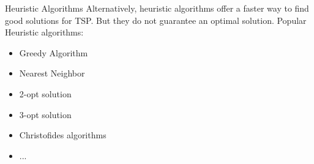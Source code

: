 \documentclass[12pt]{beamer}
\begin{document}
 \begin{frame}

  \begin{block}{Heuristic Algorithms}
     Alternatively, heuristic algorithms offer a faster way to find good solutions for TSP. But they do not guarantee an optimal solution.
    Popular Heuristic algorithms:
    \begin{itemize}
    \item Greedy Algorithm \pause
      \item Nearest Neighbor \pause
      \item 2-opt solution\pause
      \item 3-opt solution \pause
      \item Christofides algorithms \pause\\ 
      \item ...
    \end{itemize}
  \end{block}
  
\end{frame}


\end{document}
